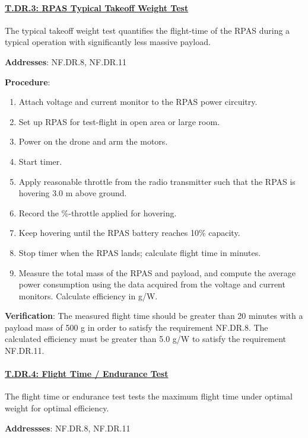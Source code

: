 \paragraph{\underline{T.DR.3: RPAS Typical Takeoff Weight Test}}

The typical takeoff weight test quantifies the flight-time of the RPAS during a typical operation with significantly less massive payload.

\textbf{Addresses}: NF.DR.8, NF.DR.11

\textbf{Procedure}:
\begin{enumerate}[noitemsep]
    \item Attach voltage and current monitor to the RPAS power circuitry.
    \item Set up RPAS for test-flight in open area or large room.
    \item Power on the drone and arm the motors.
    \item Start timer.
    \item Apply reasonable throttle from the radio transmitter such that the RPAS is hovering 3.0 m above ground.
    \item Record the \%-throttle applied for hovering.
    \item Keep hovering until the RPAS battery reaches 10\% capacity.
    \item Stop timer when the RPAS lands; calculate flight time in minutes.
    \item Measure the total mass of the RPAS and payload, and compute the average power consumption using the data acquired from the voltage and current monitors. Calculate efficiency in g/W.
\end{enumerate}

\textbf{Verification}:
The measured flight time should be greater than 20 minutes with a payload mass of 500 g in order to satisfy the requirement NF.DR.8. The calculated efficiency must be greater than 5.0 g/W to satisfy the requirement NF.DR.11.

% 

\paragraph{\underline{T.DR.4: Flight Time / Endurance Test}}

The flight time or endurance test tests the maximum flight time under optimal weight for optimal efficiency.

\textbf{Addressses}: NF.DR.8, NF.DR.11

